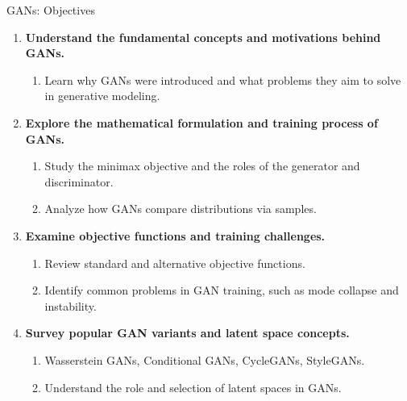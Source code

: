 \begin{frame}[allowframebreaks]{GANs: Objectives}
    \begin{enumerate}
        \setlength{\itemsep}{-0.1em}
        \item \textbf{Understand the fundamental concepts and motivations behind GANs.}
        \begin{enumerate}
            \setlength{\itemsep}{-0.75em}
            \item Learn why GANs were introduced and what problems they aim to solve in generative modeling.
        \end{enumerate}
        \item \textbf{Explore the mathematical formulation and training process of GANs.}
        \begin{enumerate}
            \setlength{\itemsep}{-0.75em}
            \item Study the minimax objective and the roles of the generator and discriminator.
            \item Analyze how GANs compare distributions via samples.
        \end{enumerate}
        \item \textbf{Examine objective functions and training challenges.}
        \begin{enumerate}
            \setlength{\itemsep}{-0.75em}
            \item Review standard and alternative objective functions.
            \item Identify common problems in GAN training, such as mode collapse and instability.
        \end{enumerate}
        \item \textbf{Survey popular GAN variants and latent space concepts.}
        \begin{enumerate}
            \setlength{\itemsep}{-0.75em}
            \item Wasserstein GANs, Conditional GANs, CycleGANs, StyleGANs.
            \item Understand the role and selection of latent spaces in GANs.
        \end{enumerate}
    \end{enumerate}
\end{frame}

